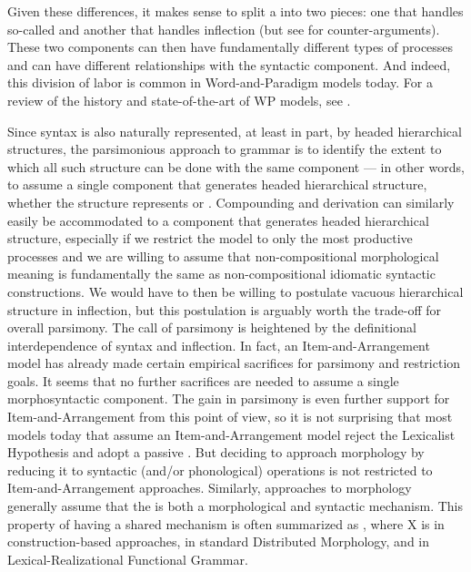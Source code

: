 \documentclass[output=paper,hidelinks]{langscibook}
\begin{document}
Given these differences, it makes sense to split a  into two
pieces: one that handles so-called  and
another that handles inflection (but see \citealt{booij96} for
counter-arguments).  These two components can then have fundamentally
different types of processes and can have different relationships with
the syntactic component.  And indeed, this division of labor is common
in Word-and-Paradigm models today. For a review of the history and
state-of-the-art of WP models, see \citet{blevins18}.

\begin{sloppypar}
  Since syntax is also naturally represented, at least in part, by
  headed hierarchical structures, the parsimonious approach to grammar
  is to identify the extent to which all such structure can be done
  with the same component --- in other words, to assume a single
  component that generates headed hierarchical structure, whether the
  structure represents  or .
  Compounding and derivation can similarly easily be accommodated to a
  component that generates headed hierarchical structure, especially if
  we restrict the model to only the most productive processes and we
  are willing to assume that non-compositional morphological meaning
  is fundamentally the same as non-compositional idiomatic syntactic
  constructions.  We would have to then be willing to postulate
  vacuous hierarchical structure in inflection, but this postulation is
  arguably worth the trade-off for overall parsimony. The call of
  parsimony is heightened by the definitional interdependence of
  syntax and inflection.  In fact, an Item-and-Arrangement model has
  already made certain empirical sacrifices for parsimony and
  restriction goals.  It seems that no further sacrifices are needed
  to assume a single morphosyntactic component.  The gain in parsimony
  is even further support for Item-and-Arrangement from this point of
  view, so it is not surprising that most models today that assume an
  Item-and-Arrangement model reject the Lexicalist Hypothesis and
  adopt a passive .  But deciding to approach morphology by
  reducing it to syntactic (and/or phonological) operations is not
  restricted to Item-and-Arrangement approaches.  Similarly,
   approaches to morphology
  \citep{Booij2010,masini;audring18} generally assume that the
   is both a morphological and syntactic
  mechanism. This property of having a shared mechanism is often
  summarized as , where X is
   in construction-based approaches,
   in standard Distributed Morphology, and
   in Lexical-Realizational Functional Grammar.
\end{sloppypar}
\end{document}
